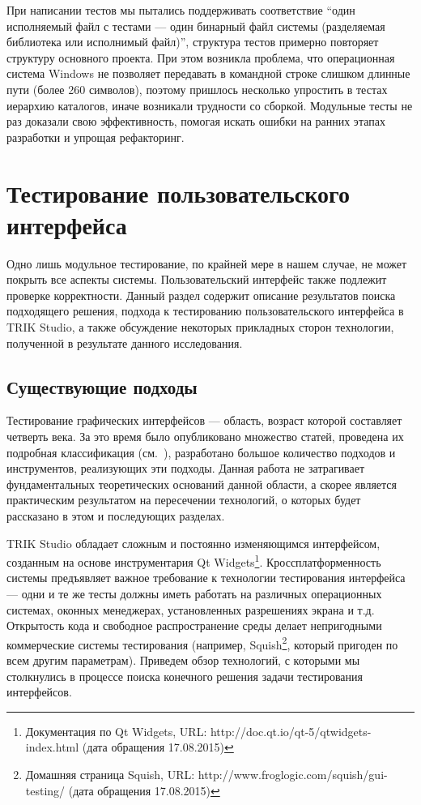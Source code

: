 \documentclass[conference]{IEEEtran}
\begin{document}
При написании тестов мы пытались поддерживать соответствие "`один исполняемый файл с тестами --- один бинарный файл системы 
(разделяемая библиотека или исполнимый файл)"', структура тестов примерно повторяет структуру основного 
проекта. При этом возникла проблема, что операционная система Windows не позволяет передавать в командной 
строке слишком длинные пути (более 260 символов), поэтому пришлось несколько упростить в тестах иерархию 
каталогов, иначе возникали трудности со сборкой. Модульные тесты не раз доказали свою эффективность, помогая 
искать ошибки на ранних этапах разработки и упрощая рефакторинг.

\section{Тестирование пользовательского интерфейса}
Одно лишь модульное тестирование, по крайней мере в нашем случае, не может покрыть все аспекты системы. 
Пользовательский интерфейс также подлежит проверке корректности. Данный раздел содержит описание результатов 
поиска подходящего решения, подхода к тестированию пользовательского интерфейса в TRIK Studio, а также 
обсуждение некоторых прикладных сторон технологии, полученной в результате данного исследования.

\subsection{Существующие подходы}
Тестирование графических интерфейсов --- область, возраст которой составляет четверть века. За это время 
было опубликовано множество статей, проведена их подробная классификация (см.~\cite{banerjee2013graphical}), 
разработано большое количество подходов и инструментов, реализующих эти подходы. Данная работа не затрагивает 
фундаментальных теоретических оснований данной области, а скорее является практическим результатом на 
пересечении технологий, о которых будет рассказано в этом и последующих разделах.

TRIK Studio обладает сложным и постоянно изменяющимся интерфейсом, созданным на основе инструментария 
Qt Widgets\footnote{Документация по Qt Widgets, URL: http://doc.qt.io/qt-5/qtwidgets-index.html (дата обращения 17.08.2015)}. 
Кроссплатформенность системы предъявляет важное требование к технологии тестирования интерфейса --- одни 
и те же тесты должны иметь работать на различных операционных системах, оконных менеджерах, установленных 
разрешениях экрана и т.д. Открытость кода и свободное распространение среды делает непригодными коммерческие 
системы тестирования (например, Squish\footnote{Домашняя страница Squish, URL: http://www.froglogic.com/squish/gui-testing/ (дата обращения 17.08.2015)}, 
который пригоден по всем другим параметрам). Приведем обзор технологий, с которыми мы столкнулись в процессе 
поиска конечного решения задачи тестирования интерфейсов.
\end{document}
